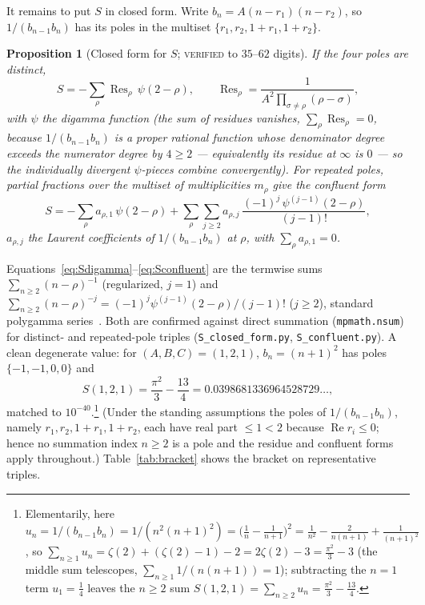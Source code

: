 \documentclass[11pt]{article}
\newtheorem{proposition}{Proposition}
\DeclareMathOperator{\Res}{Res}
\begin{document}
It remains to put $S$ in closed form. Write $b_n=A(n-r_1)(n-r_2)$, so
$1/(b_{n-1}b_n)$ has its poles in the multiset $\{r_1,r_2,1+r_1,1+r_2\}$.

\begin{proposition}[Closed form for $S$; \textsc{verified} to $35$--$62$ digits]
\label{prop:S}
If the four poles are distinct,
\begin{equation}\label{eq:Sdigamma}
  S=-\sum_{\rho}\Res_\rho\,\psi(2-\rho),\qquad
  \Res_\rho=\frac{1}{A^2\prod_{\sigma\ne\rho}(\rho-\sigma)},
\end{equation}
with $\psi$ the digamma function (the sum of residues vanishes, $\sum_\rho\Res_\rho=0$,
because $1/(b_{n-1}b_n)$ is a proper rational function whose denominator degree exceeds
the numerator degree by $4\ge2$ --- equivalently its residue at $\infty$ is $0$ --- so the
individually divergent $\psi$-pieces
combine convergently). For repeated poles, partial fractions over the multiset of
multiplicities $m_\rho$ give the confluent form
\begin{equation}\label{eq:Sconfluent}
  S=-\sum_\rho a_{\rho,1}\,\psi(2-\rho)
    +\sum_\rho\sum_{j\ge2}a_{\rho,j}\,
       \frac{(-1)^j\,\psi^{(j-1)}(2-\rho)}{(j-1)!},
\end{equation}
$a_{\rho,j}$ the Laurent coefficients of $1/(b_{n-1}b_n)$ at $\rho$, with
$\sum_\rho a_{\rho,1}=0$.
\end{proposition}

Equations~\eqref{eq:Sdigamma}--\eqref{eq:Sconfluent} are the termwise sums
$\sum_{n\ge2}(n-\rho)^{-1}$ (regularized, $j=1$) and
$\sum_{n\ge2}(n-\rho)^{-j}=(-1)^j\psi^{(j-1)}(2-\rho)/(j-1)!$ ($j\ge2$), standard
polygamma series~\cite[\S5.15]{dlmf}. Both are confirmed against direct summation
(\texttt{mpmath.nsum}) for distinct- and repeated-pole triples
(\texttt{S\_closed\_form.py}, \texttt{S\_confluent.py}). A clean degenerate value:
for $(A,B,C)=(1,2,1)$, $b_n=(n+1)^2$ has poles $\{-1,-1,0,0\}$ and
\begin{equation}\label{eq:S121}
  S(1,2,1)=\frac{\pi^2}{3}-\frac{13}{4}=0.0398681336964528729\ldots,
\end{equation}
matched to $10^{-40}$.\footnote{Elementarily, here $u_n=1/(b_{n-1}b_n)=1/(n^2(n+1)^2)
=\big(\tfrac1n-\tfrac1{n+1}\big)^2=\tfrac1{n^2}-\tfrac{2}{n(n+1)}+\tfrac1{(n+1)^2}$,
so $\sum_{n\ge1}u_n=\zeta(2)+(\zeta(2)-1)-2=2\zeta(2)-3=\tfrac{\pi^2}{3}-3$ (the middle
sum telescopes, $\sum_{n\ge1}1/(n(n+1))=1$); subtracting the $n=1$ term $u_1=\tfrac14$
leaves the $n\ge2$ sum $S(1,2,1)=\sum_{n\ge2}u_n=\tfrac{\pi^2}{3}-\tfrac{13}{4}$.} (Under the standing assumptions the poles of
$1/(b_{n-1}b_n)$, namely $r_1,r_2,1+r_1,1+r_2$, each have real part $\le1<2$ because
$\operatorname{Re}r_i\le0$; hence no summation index $n\ge2$ is a pole and the
residue and confluent forms apply throughout.) Table~\ref{tab:bracket} shows the bracket on
representative triples.
\end{document}
